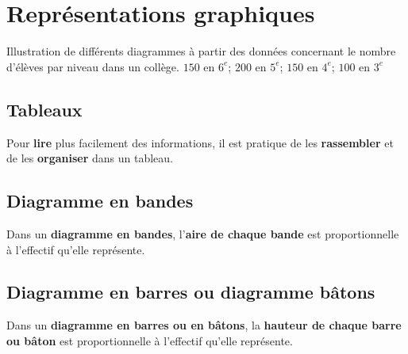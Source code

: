 \section{Représentations graphiques}
Illustration de différents diagrammes à partir des données concernant le nombre d'élèves par niveau dans un collège.
$150$ en $6^e$; $200$ en $5^e$; $150$ en $4^e$; $100$ en $3^e$
\subsection{Tableaux}
\begin{remarque}
   Pour \textbf{lire} plus facilement des informations, il est pratique de les \textbf{rassembler} et de les \textbf{organiser} dans un tableau.
\end{remarque}

\subsection{Diagramme en bandes}
\begin{definition}
   Dans un \textbf{diagramme en bandes}, l'\textbf{aire de chaque bande} est proportionnelle à l'effectif qu'elle repr\'esente.
\end{definition}

\begin{center}
\end{center}
\subsection{Diagramme en barres ou diagramme bâtons}
\begin{definition}
Dans un \textbf{diagramme en barres ou en bâtons}, la \textbf{hauteur de chaque barre ou bâton} est proportionnelle à l'effectif qu'elle repr\'esente.
\end{definition}
\begin{center}
\end{center}
